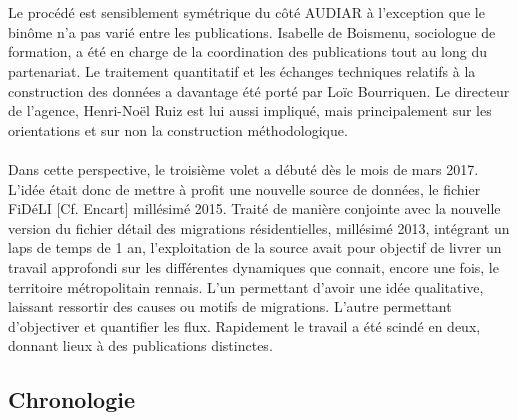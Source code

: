 \documentclass{bredele}
\begin{document}
\\\\
Le procédé est sensiblement symétrique du côté AUDIAR à l’exception que le binôme n’a pas varié entre les publications. Isabelle de Boismenu, sociologue de formation, a été en charge de la coordination des publications tout au long du partenariat. Le traitement quantitatif et les échanges techniques relatifs à la construction des données a davantage été porté par Loïc Bourriquen. Le directeur de l’agence, Henri-Noël Ruiz est lui aussi impliqué, mais principalement sur les orientations et  sur non la construction méthodologique.
\\\\
Dans cette perspective, le troisième volet a débuté dès le mois de mars 2017. L’idée était donc de mettre à profit une nouvelle source de données, le fichier FiDéLI [Cf. Encart] millésimé 2015. Traité de manière conjointe avec la nouvelle version du fichier détail des migrations résidentielles, millésimé 2013, intégrant un laps de temps de 1 an, l’exploitation de la source avait pour objectif de livrer un travail approfondi sur les différentes dynamiques que connait, encore une fois, le territoire métropolitain rennais. L’un permettant d’avoir une idée qualitative, laissant ressortir des causes ou motifs de migrations. L’autre permettant d’objectiver et quantifier les flux. Rapidement le travail a été scindé en deux, donnant lieux à des publications distinctes.
\subsection{Chronologie}
\end{document}
